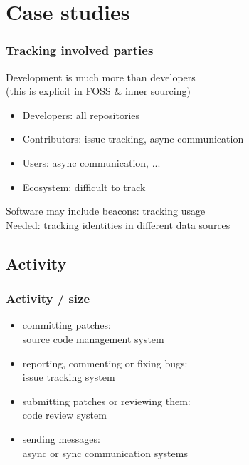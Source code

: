 \documentclass[17pt,aspectratio=169,hyperref=pdfusetitle]{beamer}
\begin{document}
\section{Case studies}


\begin{frame}
\frametitle{Tracking involved parties}

  Development is much more than developers \\
  (this is explicit in FOSS \& inner sourcing)
  
  \begin{itemize}
  \item Developers: all repositories
  \item Contributors: issue tracking, async communication
  \item Users: async communication, ...
  \item Ecosystem: difficult to track
  \end{itemize}

  \vspace{1cm}
  
  Software may include beacons: tracking usage \\

  Needed: tracking identities in different data sources \\
\end{frame}

\subsection{Activity}


\begin{frame}
\frametitle{Activity / size}

  \begin{itemize}
  \item committing patches: \\
    source code management system
  \item reporting, commenting or fixing bugs: \\
    issue tracking system
  \item submitting patches or reviewing them: \\
    code review system
  \item sending messages: \\
    async or sync communication systems

  \end{itemize}
\end{frame}
\end{document}
